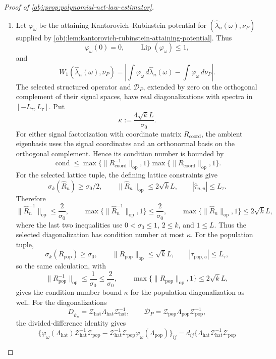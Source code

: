 \begin{proof}[Proof of \cref{obj:prop:polynomial-net-law-estimator}]
\begin{enumerate}
\item Let \(\varphi_\omega\) be the attaining Kantorovich--Rubinstein potential for
\((\widehat\lambda_n(\omega),\nu_P)\) supplied by
\cref{obj:lem:kantorovich-rubinstein-attaining-potential}.  Thus
\[
\varphi_\omega(0)=0,\qquad \operatorname{Lip}(\varphi_\omega)\le1,
\]
and
\[
W_1(\widehat\lambda_n(\omega),\nu_P)
=
\left|
\int\varphi_\omega\,d\widehat\lambda_n(\omega)
-
\int\varphi_\omega\,d\nu_P
\right|.
\]
The selected structured operator and \(\mathcal D_P\), extended by zero on the orthogonal complement of their signal spaces, have real diagonalizations with spectra in \([-L_\tau,L_\tau]\).  Put
\[
\kappa:=\frac{4\sqrt{k}L}{\sigma_0}.
\]
For either signal factorization with coordinate matrix \(R_{\mathrm{coord}}\), the ambient eigenbasis uses the signal coordinates and an orthonormal basis on the orthogonal complement.  Hence its condition number is bounded by
\[
\operatorname{cond}\le
\max\{\|R_{\mathrm{coord}}^{-1}\|_{\mathrm{op}},1\}
\max\{\|R_{\mathrm{coord}}\|_{\mathrm{op}},1\}.
\]
For the selected lattice tuple, the defining lattice constraints give
\[
\sigma_k(\widehat R_n)\ge\sigma_0/2,
\qquad
\|\widehat R_n\|_{\mathrm{op}}\le2\sqrt{k}L,
\qquad
|\widehat\tau_{n,u}|\le L_\tau .
\]
Therefore
\[
\|\widehat R_n^{-1}\|_{\mathrm{op}}\le\frac{2}{\sigma_0},
\qquad
\max\{\|\widehat R_n^{-1}\|_{\mathrm{op}},1\}\le\frac{2}{\sigma_0},
\qquad
\max\{\|\widehat R_n\|_{\mathrm{op}},1\}\le2\sqrt{k}L,
\]
where the last two inequalities use \(0<\sigma_0\le1\), \(2\le k\), and \(1\le L\).  Thus the selected diagonalization has condition number at most \(\kappa\).  For the population tuple,
\[
\sigma_k(R_{\mathrm{pop}})\ge\sigma_0,
\qquad
\|R_{\mathrm{pop}}\|_{\mathrm{op}}\le\sqrt{k}L,
\qquad
|\tau_{\mathrm{pop},u}|\le L_\tau,
\]
so the same calculation, with
\[
\|R_{\mathrm{pop}}^{-1}\|_{\mathrm{op}}\le\frac1{\sigma_0}\le\frac2{\sigma_0},
\qquad
\max\{\|R_{\mathrm{pop}}\|_{\mathrm{op}},1\}\le2\sqrt{k}L,
\]
gives the condition-number bound \(\kappa\) for the population diagonalization as well.
For the diagonalizations
\[
D_{\widehat\vartheta_n}=\mathcal Z_{\mathrm{hat}}\Lambda_{\mathrm{hat}}\mathcal Z_{\mathrm{hat}}^{-1},
\qquad
\mathcal D_P=\mathcal Z_{\mathrm{pop}}\Lambda_{\mathrm{pop}}\mathcal Z_{\mathrm{pop}}^{-1},
\]
the divided-difference identity gives
\[
\{\varphi_\omega(\Lambda_{\mathrm{hat}})\mathcal Z_{\mathrm{hat}}^{-1}\mathcal Z_{\mathrm{pop}}
-\mathcal Z_{\mathrm{hat}}^{-1}\mathcal Z_{\mathrm{pop}}\varphi_\omega(\Lambda_{\mathrm{pop}})\}_{ij}
=
d_{ij}\{\Lambda_{\mathrm{hat}}\mathcal Z_{\mathrm{hat}}^{-1}\mathcal Z_{\mathrm{pop}}
\]
\end{enumerate}
\end{proof}
